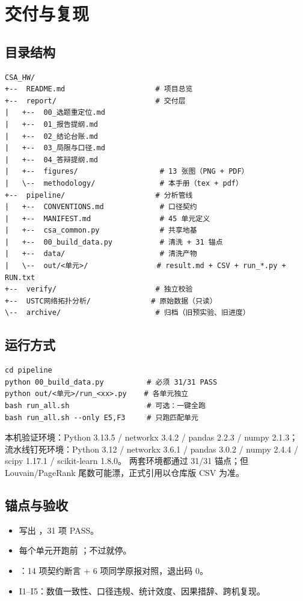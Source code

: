 \section{交付与复现}

\subsection{目录结构}

\begin{verbatim}
CSA_HW/
+--  README.md                     # 项目总览
+--  report/                       # 交付层
|   +--  00_选题重定位.md
|   +--  01_报告提纲.md
|   +--  02_结论台账.md
|   +--  03_局限与口径.md
|   +--  04_答辩提纲.md
|   +--  figures/                   # 13 张图（PNG + PDF）
|   \--  methodology/               # 本手册（tex + pdf）
+--  pipeline/                     # 分析管线
|   +--  CONVENTIONS.md             # 口径契约
|   +--  MANIFEST.md                # 45 单元定义
|   +--  csa_common.py              # 共享地基
|   +--  00_build_data.py           # 清洗 + 31 锚点
|   +--  data/                      # 清洗产物
|   \--  out/<单元>/                # result.md + CSV + run_*.py + RUN.txt
+--  verify/                       # 独立校验
+--  USTC网络拓扑分析/              # 原始数据（只读）
\--  archive/                      # 归档（旧预实验、旧进度）
\end{verbatim}

\subsection{运行方式}

\begin{verbatim}
cd pipeline
python 00_build_data.py          # 必须 31/31 PASS
python out/<单元>/run_<xx>.py    # 各单元独立
bash run_all.sh                  # 可选：一键全跑
bash run_all.sh --only E5,F3     # 只跑匹配单元
\end{verbatim}

本机验证环境：Python 3.13.5 / networkx 3.4.2 / pandas 2.2.3 / numpy 2.1.3；
流水线钉死环境：Python 3.12 / networkx 3.6.1 / pandas 3.0.2 / numpy 2.4.4 / scipy 1.17.1 / scikit-learn 1.8.0。
两套环境都通过 31/31 锚点；但 Louvain/PageRank 尾数可能漂，正式引用以仓库版 CSV 为准。

\subsection{锚点与验收}

\begin{itemize}
  \item {} 写出 ，31 项 PASS。
  \item 每个单元开跑前 ；不过就停。
  \item {}：14 项契约断言 + 6 项同学原报对照，退出码 0。
  \item I1--I5：数值一致性、口径违规、统计效度、因果措辞、跨机复现。
\end{itemize}

